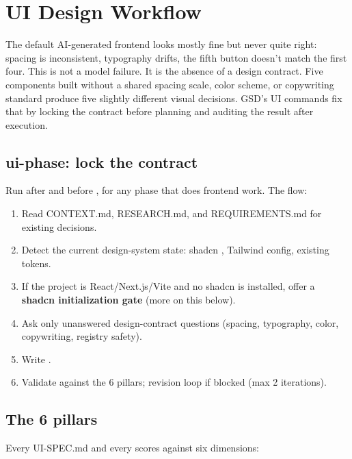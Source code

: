 \documentclass[11pt,letterpaper,openany]{book}
\begin{document}
\chapter{UI Design Workflow}

The default AI-generated frontend looks mostly fine but never quite right: spacing is inconsistent, typography drifts, the fifth button doesn't match the first four. This is not a model failure. It is the absence of a design contract. Five components built without a shared spacing scale, color scheme, or copywriting standard produce five slightly different visual decisions. GSD's UI commands fix that by locking the contract before planning and auditing the result after execution.

\section{ui-phase: lock the contract}

Run  after  and before , for any phase that does frontend work. The flow:

\begin{enumerate}[itemsep=2pt]
  \item Read CONTEXT.md, RESEARCH.md, and REQUIREMENTS.md for existing decisions.
  \item Detect the current design-system state: shadcn , Tailwind config, existing tokens.
  \item If the project is React/Next.js/Vite and no shadcn is installed, offer a \textbf{shadcn initialization gate} (more on this below).
  \item Ask only unanswered design-contract questions (spacing, typography, color, copywriting, registry safety).
  \item Write .
  \item Validate against the 6 pillars; revision loop if blocked (max 2 iterations).
\end{enumerate}

\section{The 6 pillars}

Every UI-SPEC.md and every  scores against six dimensions:
\end{document}
